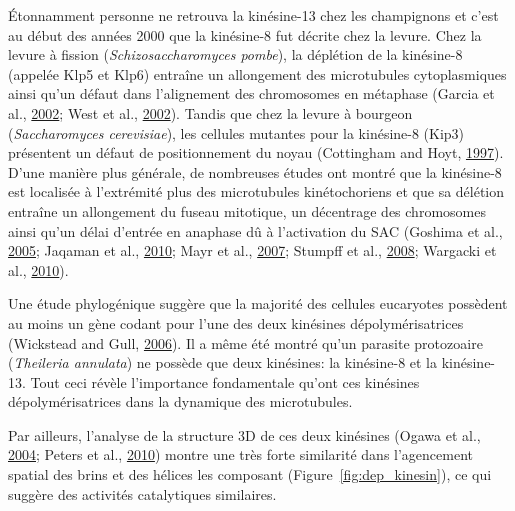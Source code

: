 \documentclass[12pt,a4paper,twoside,openright]{book}
\begin{document}
Étonnamment personne ne retrouva la kinésine-13 chez les champignons et
c'est au début des années 2000 que la kinésine-8 fut décrite chez la
levure. Chez la levure à fission (\emph{Schizosaccharomyces pombe}), la
déplétion de la kinésine-8 (appelée Klp5 et Klp6) entraîne un
allongement des microtubules cytoplasmiques ainsi qu'un défaut dans
l'alignement des chromosomes en métaphase (Garcia et al.,
\protect\hyperlink{ref-Garcia2002d}{2002}; West et al.,
\protect\hyperlink{ref-West2002}{2002}). Tandis que chez la levure à
bourgeon (\emph{Saccharomyces cerevisiae}), les cellules mutantes pour
la kinésine-8 (Kip3) présentent un défaut de positionnement du noyau
(Cottingham and Hoyt, \protect\hyperlink{ref-Cottingham1997}{1997}).
D'une manière plus générale, de nombreuses études ont montré que la
kinésine-8 est localisée à l'extrémité plus des microtubules
kinétochoriens et que sa délétion entraîne un allongement du fuseau
mitotique, un décentrage des chromosomes ainsi qu'un délai d'entrée en
anaphase dû à l'activation du SAC (Goshima et al.,
\protect\hyperlink{ref-Goshima2005}{2005}; Jaqaman et al.,
\protect\hyperlink{ref-Jaqaman2010}{2010}; Mayr et al.,
\protect\hyperlink{ref-Mayr2007}{2007}; Stumpff et al.,
\protect\hyperlink{ref-Stumpff2008}{2008}; Wargacki et al.,
\protect\hyperlink{ref-Wargacki2010}{2010}).

Une étude phylogénique suggère que la majorité des cellules eucaryotes
possèdent au moins un gène codant pour l'une des deux kinésines
dépolymérisatrices (Wickstead and Gull,
\protect\hyperlink{ref-Wickstead2006}{2006}). Il a même été montré qu'un
parasite protozoaire (\emph{Theileria annulata}) ne possède que deux
kinésines: la kinésine-8 et la kinésine-13. Tout ceci révèle
l'importance fondamentale qu'ont ces kinésines dépolymérisatrices dans
la dynamique des microtubules.

Par ailleurs, l'analyse de la structure 3D de ces deux kinésines (Ogawa
et al., \protect\hyperlink{ref-Ogawa2004}{2004}; Peters et al.,
\protect\hyperlink{ref-Peters2010}{2010}) montre une très forte
similarité dans l'agencement spatial des brins et des hélices les
composant (Figure~\ref{fig:dep_kinesin}), ce qui suggère des activités
catalytiques similaires.
\end{document}
